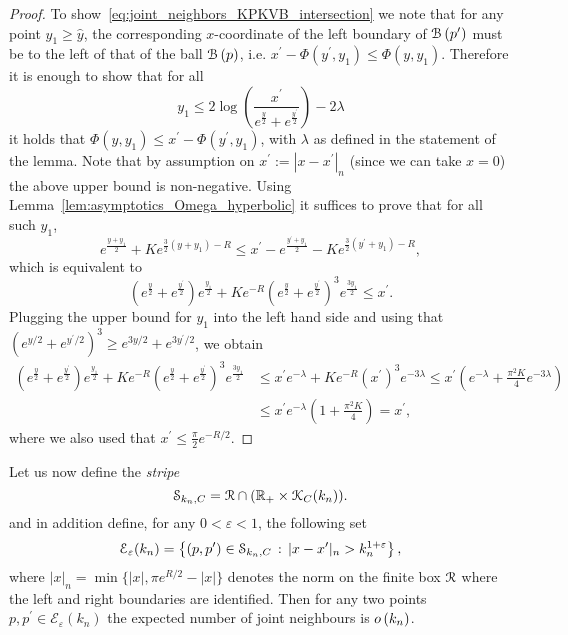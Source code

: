\begin{proof}
To show~\eqref{eq:joint_neighbors_KPKVB_intersection} we note that for any point $y_1 \ge \hat{y}$, the corresponding $x$-coordinate of the left boundary of ${\mathcal B}\left(p^\prime\right)$ must be to the left of that of the ball ${\mathcal B}\left(p\right)$, i.e.
$x^\prime - \Phi(y^\prime, y_1) \le \Phi(y,y_1)$. Therefore it is enough to show that for all 
\[
	y_1 \le 2 \log\left(\frac{x^\prime}{e^{\frac{y}{2}} + e^{\frac{y^\prime}{2}}}\right) - 2\lambda
\]
it holds that $\Phi(y,y_1) \le x^\prime - \Phi(y^\prime, y_1)$, with $\lambda$ as defined in the statement of the lemma. Note that by assumption on $x^\prime := |x - x^\prime|_n$ (since we can take $x = 0$) the above upper bound is non-negative. Using Lemma~\ref{lem:asymptotics_Omega_hyperbolic} it suffices to prove that for all such $y_1$,
\[
	e^{\frac{y + y_1}{2}} + K e^{\frac{3}{2}(y + y_1) - R} \le x^\prime - e^{\frac{y^\prime + y_1}{2}}
	- K e^{\frac{3}{2}(y^\prime + y_1) - R},
\]
which is equivalent to
\[
	\left(e^{\frac{y}{2}} + e^{\frac{y^\prime}{2}}\right) e^{\frac{y_1}{2}} 
	+ K e^{-R} \left(e^{\frac{y}{2}} + e^{\frac{y^\prime}{2}}\right)^3 e^{\frac{3 y_1}{2}} \le x^\prime.
\]
Plugging the upper bound for $y_1$ into the left hand side and using that $(e^{y/2} + e^{y^\prime/2})^3 \ge e^{3y/2} + e^{3y^\prime/2}$, we obtain
\begin{align*}
	\left(e^{\frac{y}{2}} + e^{\frac{y^\prime}{2}}\right) e^{\frac{y_1}{2}} 
		+ K e^{-R} \left(e^{\frac{y}{2}} + e^{\frac{y^\prime}{2}}\right)^3 e^{\frac{3 y_1}{2}}
	&\le x^\prime e^{-\lambda} + K e^{-R} (x^\prime)^3 e^{-3\lambda}
		\le x^\prime \left(e^{-\lambda} + \frac{\pi^2 K}{4} e^{-3\lambda}\right)\\
	&\le x^\prime e^{-\lambda} \left(1 + \frac{\pi^2 K}{4}\right) = x^\prime,
\end{align*} 
where we also used that $x^\prime \le \frac{\pi}{2} e^{-R/2}$.
\end{proof}

Let us now define the \emph{stripe}
\begin{equation}\label{eq:def_stripe}
	\mathcal{S}_{k_n,C} = {\mathcal R} \cap ({\mathbb R}_+ \times {\mathcal K}_C(k_n)).
\end{equation} 
and in addition define, for any $0 < \varepsilon < 1$, the following set
\begin{equation}\label{eq:def_joint_degree_set_E_growing_k}
	\mathcal{E}_{\varepsilon}(k_n) = \left\{(p,p^\prime) \in \mathcal{S}_{k_n,C}
		\, : \,  |x - x^\prime|_n > k_n^{1 + \varepsilon} \right\}, 
\end{equation}
where $|x|_n = \min\{|x|, \pi e^{R/2} - |x|\}$ denotes the norm on the finite box ${\mathcal R}$ where the left and right boundaries are identified. Then for any two points $p,p^\prime \in \mathcal{E}_\varepsilon(k_n)$ the expected number of joint neighbours is $o\left(k_n\right)$.

